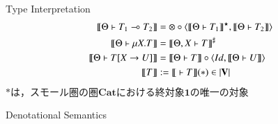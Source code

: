 \documentclass[10pt]{jsarticle}
\newcommand{\semantics}[1]{{\llbracket #1 \rrbracket}}
\begin{document}
\begin{itembox}[c]{Type Interpretation}
\begin{align*}
    \semantics{\Theta \vdash T_1\multimap{}T_2}  &= \otimes\circ\langle\semantics{\Theta \vdash T_1}^\star,\semantics{\Theta \vdash T_2}\rangle \\
    \semantics{\Theta \vdash \mu{X}.T}           &= \semantics{\Theta,X \vdash T}^\sharp \\
    \semantics{\Theta \vdash T[X \rightarrow U]} &= \semantics{\Theta \vdash T}\circ\langle{Id,\semantics{\Theta \vdash U}}\rangle \\
    \semantics{T}                                &:= \semantics{\; \vdash T}(\ast) \in |{\bf V}|
  \end{align*}
  $\ast$は，スモール圏の圏$\mathbf{Cat}$における終対象$\mathbf{1}$の唯一の対象
\end{itembox}

\begin{itembox}[c]{Denotational Semantics}

\end{itembox}
\end{document}
